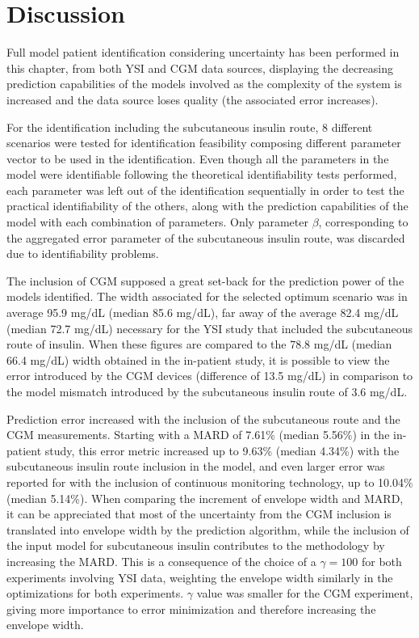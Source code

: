 \section{Discussion}
\label{sec:CGMdiscussion}

Full model patient identification considering uncertainty has been performed in this chapter, from both YSI and CGM data sources, displaying the decreasing prediction capabilities of the models involved as the complexity of the system is increased and the data source loses quality (the associated error increases).

For the identification including the subcutaneous insulin route, 8 different scenarios were tested for identification feasibility composing different parameter vector to be used in the identification. Even though all the parameters in the model were identifiable following the theoretical identifiability tests performed, each parameter was left out of the identification sequentially in order to test the practical identifiability of the others, along with the prediction capabilities of the model with each combination of parameters. Only parameter $\beta$, corresponding to the aggregated error parameter of the subcutaneous insulin route, was discarded due to identifiability problems.

The inclusion of CGM supposed a great set-back for the prediction power of the models identified. The width associated for the selected optimum scenario was in average 95.9 mg/dL (median 85.6 mg/dL), far away of the average 82.4 mg/dL (median 72.7 mg/dL) necessary for the YSI study that included the subcutaneous route of insulin. When these figures are compared to the 78.8 mg/dL (median 66.4 mg/dL) width obtained in the in-patient study, it is possible to view the error introduced by the CGM devices (difference of 13.5 mg/dL) in comparison to the model mismatch introduced by the subcutaneous insulin route of 3.6 mg/dL.

Prediction error increased with the inclusion of the subcutaneous route and the CGM measurements. Starting with a MARD of 7.61\% (median 5.56\%) in the in-patient study, this error metric increased up to 9.63\% (median 4.34\%) with the subcutaneous insulin route inclusion in the model, and even larger error was reported for with the inclusion of continuous monitoring technology, up to 10.04\% (median 5.14\%). When comparing the increment of envelope width and MARD, it can be appreciated that most of the uncertainty from the CGM inclusion is translated into envelope width by the prediction algorithm, while the inclusion of the input model for subcutaneous insulin contributes to the methodology by increasing the MARD. This is a consequence of the choice of a $\gamma=100$ for both experiments involving YSI data, weighting the envelope width similarly in the optimizations for both experiments. $\gamma$ value was smaller for the CGM experiment, giving more importance to error minimization and therefore increasing the envelope width.

